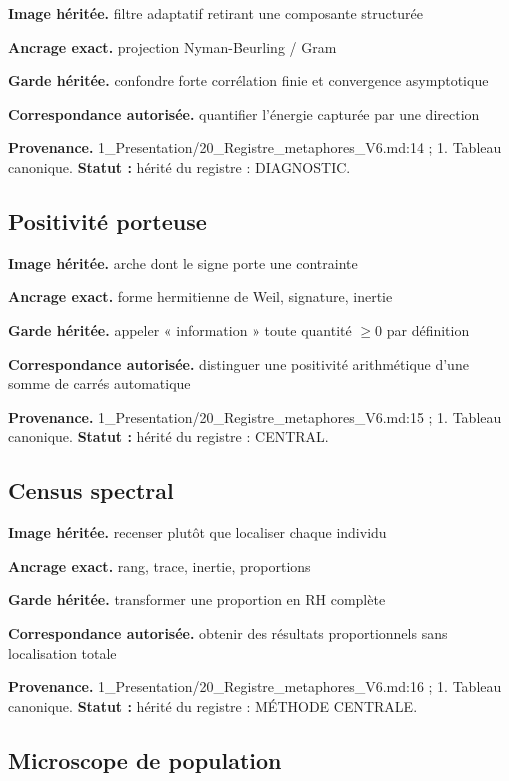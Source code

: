 \documentclass[
  9pt,
  a4paper,
]{article}
\begin{document}
\textbf{Image héritée.} filtre adaptatif retirant une composante
structurée

\textbf{Ancrage exact.} projection Nyman-Beurling / Gram

\textbf{Garde héritée.} confondre forte corrélation finie et convergence
asymptotique

\textbf{Correspondance autorisée.} quantifier l'énergie capturée par une
direction

\textbf{Provenance.} 1\_Presentation/20\_Registre\_metaphores\_V6.md:14
; 1. Tableau canonique. \textbf{Statut :} hérité du registre :
DIAGNOSTIC.

\hypertarget{positivituxe9-porteuse}{%
\subsection{Positivité porteuse}\label{positivituxe9-porteuse}}

\textbf{Image héritée.} arche dont le signe porte une contrainte

\textbf{Ancrage exact.} forme hermitienne de Weil, signature, inertie

\textbf{Garde héritée.} appeler « information » toute quantité \(\ge0\)
par définition

\textbf{Correspondance autorisée.} distinguer une positivité
arithmétique d'une somme de carrés automatique

\textbf{Provenance.} 1\_Presentation/20\_Registre\_metaphores\_V6.md:15
; 1. Tableau canonique. \textbf{Statut :} hérité du registre : CENTRAL.

\hypertarget{census-spectral}{%
\subsection{Census spectral}\label{census-spectral}}

\textbf{Image héritée.} recenser plutôt que localiser chaque individu

\textbf{Ancrage exact.} rang, trace, inertie, proportions

\textbf{Garde héritée.} transformer une proportion en RH complète

\textbf{Correspondance autorisée.} obtenir des résultats proportionnels
sans localisation totale

\textbf{Provenance.} 1\_Presentation/20\_Registre\_metaphores\_V6.md:16
; 1. Tableau canonique. \textbf{Statut :} hérité du registre : MÉTHODE
CENTRALE.

\hypertarget{microscope-de-population}{%
\subsection{Microscope de population}\label{microscope-de-population}}
\end{document}
